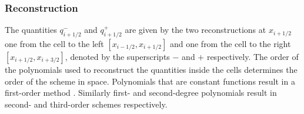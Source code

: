 \documentclass[SingleSpace,12pt]{Serre_ASCE}
\begin{document}
\subsubsection{Reconstruction} %
The quantities $q^-_{i + 1/2}$ and $q^+_{i + 1/2}$ are given by the two reconstructions at $x_{i + 1/2}$ one from the cell to the left $[x_{i - 1/2}, x_{i+ 1/2}]$ and one from the cell to the right $[x_{i + 1/2}, x_{i+ 3/2}]$, denoted by the superscripts $-$ and $+$ respectively. The order of the polynomials used to reconstruct the quantities inside the cells determines the order of the scheme in space. Polynomials that are constant functions result in a first-order method \cite{Godunov-1959-271}. Similarly first- and second-degree polynomials result in second- and third-order schemes respectively. 
\end{document}
